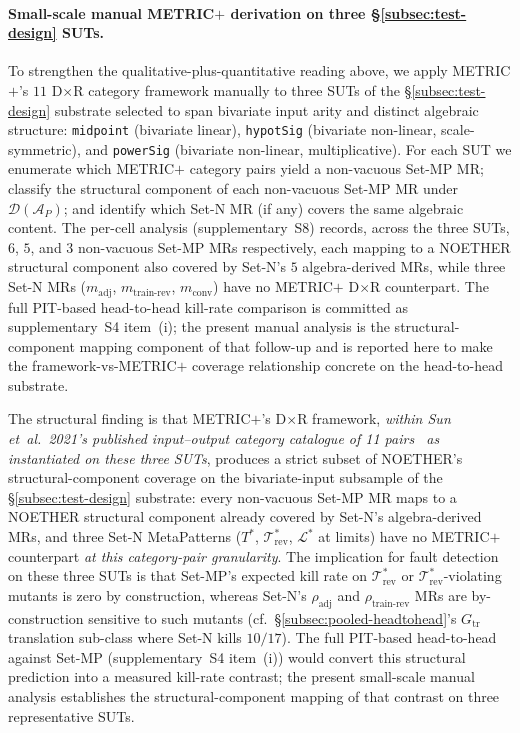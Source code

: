\documentclass[acmsmall,screen,review]{acmart}
\begin{document}
\paragraph{Small-scale manual METRIC$+$ derivation on three \S\ref{subsec:test-design} SUTs.}
\label{para:metricplus-headtohead-small}
To strengthen the qualitative-plus-quantitative reading above, we apply
METRIC$+$'s $11$ D$\times$R category framework manually to three SUTs of
the \S\ref{subsec:test-design} substrate selected to span bivariate
input arity and distinct algebraic structure: \texttt{midpoint}
(bivariate linear), \texttt{hypotSig} (bivariate non-linear, scale-symmetric),
and \texttt{powerSig} (bivariate non-linear, multiplicative). For each
SUT we enumerate which METRIC$+$ category pairs yield a non-vacuous
Set-MP MR; classify the structural component of each non-vacuous Set-MP MR
under $\mathcal{D}(\mathcal{A}_P)$; and identify which Set-N MR (if any)
covers the same algebraic content. The per-cell analysis (supplementary~S8) records, across the three SUTs, $6$, $5$, and $3$ non-vacuous Set-MP MRs respectively, each mapping to a NOETHER structural component also covered by Set-N's $5$ algebra-derived MRs, while three Set-N MRs ($m_{\mathrm{adj}}$, $m_{\mathrm{train\text{-}rev}}$, $m_{\mathrm{conv}}$) have no METRIC$+$ D$\times$R counterpart. The full PIT-based head-to-head kill-rate
comparison is committed as supplementary~S4 item~(i); the
present manual analysis is the structural-component mapping component of
that follow-up and is reported here to make the framework-vs-METRIC$+$
coverage relationship concrete on the head-to-head substrate.


The structural finding is
that METRIC$+$'s D$\times$R framework, \emph{within Sun et~al.\ 2021's
published input--output category catalogue of 11 pairs~\cite{SunMETRICplus2021}
as instantiated on these three SUTs}, produces a strict subset of NOETHER's
structural-component coverage on the bivariate-input subsample of the \S\ref{subsec:test-design}
substrate: every non-vacuous Set-MP MR maps to a NOETHER structural component already
covered by Set-N's algebra-derived MRs, and three Set-N MetaPatterns
($T^{*}$, $\mathcal{T}^{*}_{\mathrm{rev}}$, $\mathcal{L}^{*}$ at limits)
have no METRIC$+$ counterpart \emph{at this category-pair granularity}. The implication for fault detection on
these three SUTs is that Set-MP's expected kill rate on $\mathcal{T}^{*}_{\mathrm{rev}}$
or $\mathcal{T}^{*}_{\mathrm{rev}}$-violating mutants is zero by
construction, whereas Set-N's $\rho_{\mathrm{adj}}$ and
$\rho_{\mathrm{train\text{-}rev}}$ MRs are by-construction sensitive
to such mutants (cf.\ \S\ref{subsec:pooled-headtohead}'s
$G_{\mathrm{tr}}$ translation sub-class where Set-N kills $10/17$). The full PIT-based
head-to-head against Set-MP (supplementary~S4 item~(i))
would convert this structural prediction into a measured kill-rate
contrast; the present small-scale manual analysis establishes the
structural-component mapping of that contrast on three representative SUTs.
\end{document}
